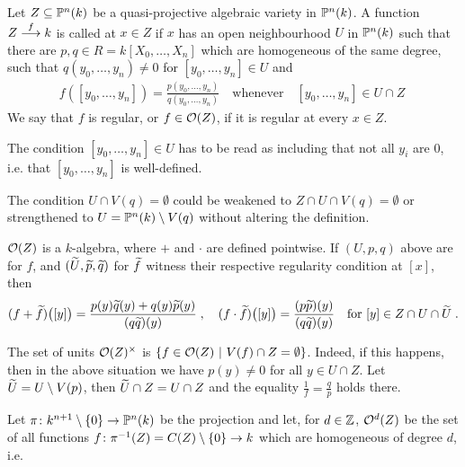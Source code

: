 \documentclass[a4paper,parskip=half,numbers=enddot, DIV=12]{scrreprt}
\begin{document}
\begin{defi}
    Let $Z\subseteq\mathbb{P}^n(k)$ be a quasi-projective algebraic variety in $\mathbb{P}^n(k)$. A function $Z\morphism[f] k$ is called  at $x\in Z$ if $x$ has an open neighbourhood $U$ in $\mathbb{P}^n(k)$ such that there are $p,q\in R = k[X_0,\ldots,X_n]$ which are homogeneous of the same degree, such that $q(y_0,\ldots,y_n) \neq 0$ for $[y_0,\ldots,y_n]\in U$ and
    \begin{align*}
    	f([y_0,\ldots,y_n]) = \frac{p(y_0,\ldots,y_n)}{q(y_0,\ldots,y_n)}\quad\text{whenever}\quad[y_0,\ldots, y_n]\in U\cap Z\; 
    \end{align*}
    We say that $f$ is regular, or $f\in \mathcal{O}(Z)$, if it is regular at every $x\in Z$.
\end{defi}
\begin{rem*}
    \begin{alphanumerate}
        \item 
            The condition $[y_0,\ldots, y_n]\in U$ has to be read as including that not all $y_i$ are $0$, i.e. that $[y_0,\ldots, y_n]$ is well-defined.
        \item 
            The condition $U\cap V(q) = \emptyset$ could be weakened to $Z\cap U\cap V(q) = \emptyset$ or strengthened to $U=\mathbb{P}^n(k)\setminus V(q)$ without altering the definition.
        \item 
            $\mathcal{O}(Z)$ is a $k$-algebra, where $+$ and $\cdot$ are defined pointwise. If $(U,p,q)$ above are for $f$, and $(\snake U, \snake p, \snake q)$ for $\snake f$ witness their respective regularity condition at $[x]$, then
            \begin{align*}
                (f+\snake f)\big([y]\big) = \frac{p(y)\snake q(y) + q(y)\snake p(y)}{(q\snake q)(y)}\;,\quad
                (f\cdot\snake f)\big([y]\big) = \frac{(p\snake p)(y)}{(q\snake q)(y)}\quad\text{for }[y]\in Z\cap U\cap\snake U\;.
            \end{align*}
        \item 
            The set of units $\mathcal{O}(Z)^\times$ is $\left\{f\in \mathcal{O}(Z)\ \middle|\  V(f)\cap Z = \emptyset\right\}$. Indeed, if this happens, then in the above situation we have $p(y)\neq0$ for all $y\in U\cap Z$. Let $\snake U = U\setminus V(p)$, then $\snake U \cap Z = U\cap Z$ and the equality $\frac{1}{f} = \frac{q}{p}$ holds there.
        \item 
            Let $\pi\colon k^{n+1}\setminus \{0\} \morphism \IP^n(k)$ be the projection and let, for $d\in \mathbb{Z}$, $\mathcal{O}^d(Z)$ be the set of all functions $f\colon \pi^{-1}(Z) = C(Z)\setminus\{0\}\morphism k$ which are homogeneous of degree $d$, i.e.

\end{alphanumerate}
\end{rem*}
\end{document}
